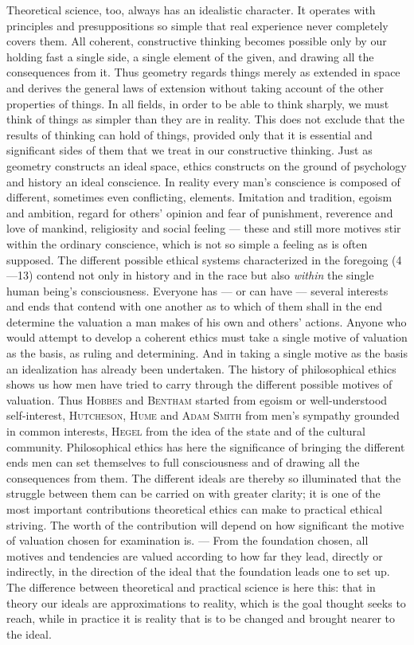 \documentclass[12pt,a4paper,openany]{book}
\newcommand{\opage}[1]{\marginnote{\footnotesize\textit{[#1]}}}
\begin{document}
Theoretical science, too, always has an idealistic character. It operates with principles and
presuppositions so simple that real experience never completely covers them. All coherent,
constructive thinking becomes possible only by our holding fast a single side, a single element of
the given, and drawing all the consequences from it. Thus geometry regards things merely as extended
in space and derives the general laws of extension without taking account of the other properties of
things. In all fields, in order to be able to think sharply, we must think of things as simpler than
they are in reality. This does not exclude that the results of thinking can hold of things, provided
only that it is essential and significant sides of them that we treat in our constructive thinking.
Just as geometry constructs an ideal space, ethics constructs on the ground of psychology and history
an ideal conscience. In reality every man's conscience is composed of different, sometimes even
conflicting, elements. Imitation and tradition, egoism and ambition, regard for others' opinion and
fear of punishment, reverence and love of mankind, religiosity and social feeling --- these and still
more motives stir within the ordinary conscience, which is not so simple a feeling as is often
supposed. The different possible ethical systems characterized in the foregoing (4---13) contend not
only in history and in the race but also \textit{within} the single
\opage{64}human being's consciousness. Everyone has --- or can have --- several interests and ends that contend
with one another as to which of them shall in the end determine the valuation a man makes of his own
and others' actions. Anyone who would attempt to develop a coherent ethics must take a single motive
of valuation as the basis, as ruling and determining. And in taking a single motive as the basis an
idealization has already been undertaken. The history of philosophical ethics shows us how men have
tried to carry through the different possible motives of valuation. Thus \textsc{Hobbes} and
\textsc{Bentham} started from egoism or well-understood self-interest, \textsc{Hutcheson},
\textsc{Hume} and \textsc{Adam Smith} from men's sympathy grounded in common interests, \textsc{Hegel}
from the idea of the state and of the cultural community. Philosophical ethics has here the
significance of bringing the different ends men can set themselves to full consciousness and of
drawing all the consequences from them. The different ideals are thereby so illuminated that the
struggle between them can be carried on with greater clarity; it is one of the most important
contributions theoretical ethics can make to practical ethical striving. The worth of the
contribution will depend on how significant the motive of valuation chosen for examination is. ---
From the foundation chosen, all motives and tendencies are valued according to how far they lead,
directly or indirectly, in the direction of the ideal that the foundation leads one to set up. The
difference between theoretical and practical science is here this: that in theory our ideals are
approximations to reality, which is the goal thought seeks to reach, while in practice it is reality
that is to be changed and brought nearer to the ideal.
\end{document}
